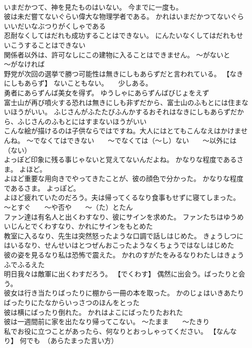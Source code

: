 \documentclass[8pt]{extreport}
\begin{document}
\begin{CJK}{UTF8}{min}
\\	いまだかつて、神を見たものはいない。	今までに一度も。
\\	彼は未だ嘗てないぐらい偉大な物理学者である。	かれはいまだかつてないぐらいいだいなぶつりがくしゃである 
\\	忍耐なくしてはだれも成功することはできない。	にんたいなくしてはだれもせいこうすることはできない 
\\	関係者以外は、許可なしにこの建物に入ることはできません。	～がないと　　～がなければ
\\	野党が次回の選挙で勝つ可能性は無きにしもあらずだと言われている。	【なきにしもあらず】 ないこともない。　　少しある。
\\	勇者にあらずんば美女を得ず。	ゆうしゃにあらずんばびじょをえず 
\\	富士山が再び噴火する恐れは無きにしも非ずだから、富士山のふもとには住まないほうがいい。	ふじさんがふたたびふんかするおそれはなきにしもあらずだから、ふじさんのふもとにはすまないほうがいい 
\\	こんな絵が描けるのは子供ならではですね。大人にはとてもこんなえはかけませんね。	～でなくてはできない　　～でなくては（～し）ない　　～以外には（ない）
\\	よっぽど印象に残る事じゃないと覚えてないんだよね。	かなりな程度であるさま。 よほど。
\\	よほど重要な用向きでやってきたことが、彼の顔色で分かった。	かなりな程度であるさま。 よっぽど。
\\	よほど疲れていたのだろう。夫は帰ってくるなり食事もせずに寝てしまった。	～とすぐ　　～や否や　　～（た）とたん
\\	ファン達は有名人と出くわすなり、彼にサインを求めた。	ファンたちはゆうめいじんとでくわすなり、かれにサインをもとめた 
\\	教室に入るなり、先生は突然怒ったような口調で話しはじめた。	きょうしつにはいるなり、せんせいはとつぜんおこったようなくちょうではなしはじめた 
\\	彼の姿を見るなり私は恐怖で震えた。	かれのすがたをみるなりわたしはきょうふでふるえた 
\\	明日我々は敵軍に出くわすだろう。	【でくわす】 偶然に出会う。ばったりと会う。
\\	彼女は行き当たりばったりに棚から一冊の本を取った。	かのじょはいきあたりばったりにたなからいっさつのほんをとった 
\\	彼は横にばったり倒れた。	かれはよこにばったりたおれた 
\\	彼は一週間前に家を出たなり帰ってこない。	～たまま　　～たきり
\\	私でお役に立つことがあったら、何なりとおっしゃってください。	【なんなり】 何でも　（あらたまった言い方）

\end{CJK}
\end{document}
